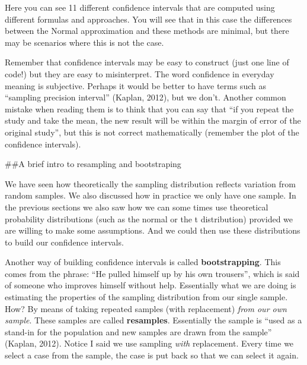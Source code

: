\documentclass[]{book}
\newenvironment{Shaded}{\begin{snugshade}}{\end{snugshade}}
\newcommand{\CommentTok}[1]{\textcolor[rgb]{0.56,0.35,0.01}{\textit{#1}}}
\newcommand{\DecValTok}[1]{\textcolor[rgb]{0.00,0.00,0.81}{#1}}
\newcommand{\KeywordTok}[1]{\textcolor[rgb]{0.13,0.29,0.53}{\textbf{#1}}}
\newcommand{\NormalTok}[1]{#1}
\newcommand{\OperatorTok}[1]{\textcolor[rgb]{0.81,0.36,0.00}{\textbf{#1}}}
\newcommand{\StringTok}[1]{\textcolor[rgb]{0.31,0.60,0.02}{#1}}
\theoremstyle{definition}
\theoremstyle{definition}
\theoremstyle{definition}
\theoremstyle{remark}
\begin{document}
Here you can see 11 different confidence intervals that are computed
using different formulas and approaches. You will see that in this case
the differences between the Normal approximation and these methods are
minimal, but there may be scenarios where this is not the case.

Remember that confidence intervals may be easy to construct (just one
line of code!) but they are easy to misinterpret. The word confidence in
everyday meaning is subjective. Perhaps it would be better to have terms
such as ``sampling precision interval'' (Kaplan, 2012), but we don't.
Another common mistake when reading them is to think that you can say
that ``if you repeat the study and take the mean, the new result will be
within the margin of error of the original study'', but this is not
correct mathematically (remember the plot of the confidence intervals).

\#\#A brief intro to resampling and bootstraping

We have seen how theoretically the sampling distribution reflects
variation from random samples. We also discussed how in practice we only
have one sample. In the previous sections we also saw how we can some
times use theoretical probability distributions (such as the normal or
the t distribution) provided we are willing to make some assumptions.
And we could then use these distributions to build our confidence
intervals.

Another way of building confidence intervals is called
\textbf{bootstrapping}. This comes from the phrase: ``He pulled himself
up by his own trousers'', which is said of someone who improves himself
without help. Essentially what we are doing is estimating the properties
of the sampling distribution from our single sample. How? By means of
taking repeated samples (with replacement) \emph{from our own sample}.
These samples are called \textbf{resamples}. Essentially the sample is
``used as a stand-in for the population and new samples are drawn from
the sample'' (Kaplan, 2012). Notice I said we use sampling \emph{with}
replacement. Every time we select a case from the sample, the case is
put back so that we can select it again.

\begin{Shaded}
\end{Shaded}
\end{document}
